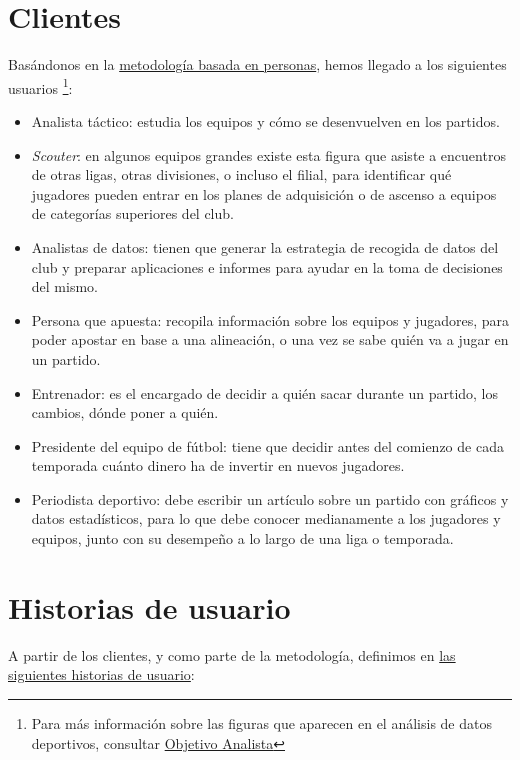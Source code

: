 \section{Clientes}
Basándonos en la \href{https://www.designthinking.services/herramientas-design-thinking/metodo-persona/}{metodología basada en personas}, 
hemos llegado a los siguientes usuarios \footnote{Para más información sobre las
  figuras que aparecen en el análisis de datos deportivos, consultar
  \href{https://objetivoanalista.com}{Objetivo Analista}}:
\begin{itemize}
    \item Analista táctico: estudia los equipos y cómo se desenvuelven en los partidos. 
    \item {\em Scouter}: en algunos equipos grandes existe esta figura que asiste a
      encuentros de otras ligas, otras divisiones, o incluso el filial, para
      identificar qué jugadores pueden entrar en los planes de adquisición o de
      ascenso a equipos de categorías superiores del club.
    \item Analistas de datos: tienen que generar la estrategia de recogida de
      datos del club y preparar aplicaciones e informes para ayudar en la toma de
      decisiones del mismo.
    \item Persona que apuesta: recopila información sobre los equipos y jugadores, para poder apostar 
    en base a una alineación, o una vez se sabe quién va a jugar en un partido. 
    \item Entrenador: es el encargado de decidir a quién sacar durante un partido, los 
    cambios, dónde poner a quién. 
    \item Presidente del equipo de fútbol: tiene que decidir antes del comienzo 
    de cada temporada cuánto dinero ha de invertir en nuevos jugadores. 
    \item Periodista deportivo: debe escribir un artículo sobre un partido con gráficos y datos estadísticos, 
    para lo que debe conocer medianamente a los jugadores y equipos, junto con su desempeño a lo largo de 
    una liga o temporada. 
\end{itemize}

\section{Historias de usuario}  

A partir de los clientes, y como parte de la metodología, definimos en \href{https://github.com/ElenaMerelo/TFG/issues?q=is%3Aopen+is%3Aissue+label%3Auser-story}{las siguientes historias de usuario}: 

